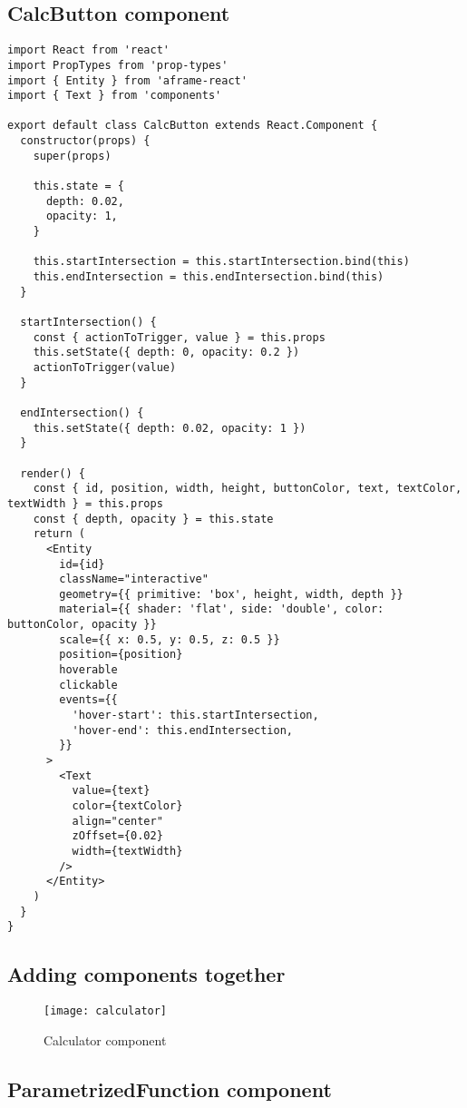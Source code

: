 \subsection{CalcButton component}


\begin{lstlisting}
import React from 'react'
import PropTypes from 'prop-types'
import { Entity } from 'aframe-react'
import { Text } from 'components'

export default class CalcButton extends React.Component {
  constructor(props) {
    super(props)

    this.state = {
      depth: 0.02,
      opacity: 1,
    }

    this.startIntersection = this.startIntersection.bind(this)
    this.endIntersection = this.endIntersection.bind(this)
  }

  startIntersection() {
    const { actionToTrigger, value } = this.props
    this.setState({ depth: 0, opacity: 0.2 })
    actionToTrigger(value)
  }

  endIntersection() {
    this.setState({ depth: 0.02, opacity: 1 })
  }

  render() {
    const { id, position, width, height, buttonColor, text, textColor, textWidth } = this.props
    const { depth, opacity } = this.state
    return (
      <Entity
        id={id}
        className="interactive"
        geometry={{ primitive: 'box', height, width, depth }}
        material={{ shader: 'flat', side: 'double', color: buttonColor, opacity }}
        scale={{ x: 0.5, y: 0.5, z: 0.5 }}
        position={position}
        hoverable
        clickable
        events={{
          'hover-start': this.startIntersection,
          'hover-end': this.endIntersection,
        }}
      >
        <Text
          value={text}
          color={textColor}
          align="center"
          zOffset={0.02}
          width={textWidth}
        />
      </Entity>
    )
  }
}
\end{lstlisting}


\subsection{Adding components together}
\begin{figure}[ht!]
\centering
\texttt{[image: calculator]}
\caption{Calculator component}
\label{r:2}
\end{figure}

\subsection{ParametrizedFunction component}
